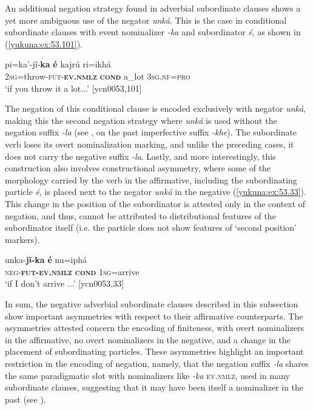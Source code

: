 \documentclass[output=paper,colorlinks,citecolor=brown]{langscibook}
\begin{document}
An additional negation strategy found in adverbial subordinate clauses shows a yet more ambiguous use of the negator \textit{unká}. This is the case in conditional subordinate clauses with event nominalizer \textit{-ka} and subordinator \textit{é}, as shown in (\ref{yukuna:ex:53.101}). 

\ea\label{yukuna:ex:53.101}
\gll pi=ka'-jĩ-\textbf{ka} \textbf{é}	kajrú 	ri=ikhá \\
\textsc{2sg}=throw-\textsc{fut}-\textbf{\textsc{ev.nmlz}} \textbf{\textsc{cond}} a\_lot \textsc{3sg.nf}=\textsc{pro} \\
\glt ‘if you throw it a lot{...}’ [ycn0053,101]
\z

The negation of this conditional clause is encoded exclusively with negator \textit{unká}, making this the second negation strategy where \textit{unká} is used without the negation suffix \textit{-la} (see , on the past imperfective suffix \textit{-khe}). The subordinate verb loses its overt nominalization marking, and unlike the preceding cases, it does not carry the negative suffix \textit{-la}. Lastly, and more interestingly, this construction also involves constructional asymmetry, where some of the morphology carried by the verb in the affirmative,  including the subordinating particle \textit{é}, is placed next to the negator \textit{unká} in the negative (\ref{yukuna:ex:53.33}). This change in the position of the subordinator is attested only in the context of negation, and thus, cannot be attributed to distributional features of the subordinator itself (i.e. the particle does not show features of `second position’ markers).

\ea\label{yukuna:ex:53.33}
\gll unka-\textbf{jĩ-ka} \textbf{é} 	nu=iphá \\
\textsc{neg}-\textbf{\textsc{fut}-\textsc{ev.nmlz}}  \textbf{\textsc{cond}} \textsc{1sg}=arrive \\
\glt ‘if I don't arrive {...}’ [ycn0053,33]
\z

In sum, the negative adverbial subordinate clauses described in this subsection show important asymmetries with respect to their affirmative counterparts. The asymmetries attested concern the encoding of finiteness, with overt nominalizers in the affirmative, no overt nominalizers in the negative, and a change in the placement of subordinating particles. These asymmetries highlight an important restriction in the encoding of negation, namely, that the negation suffix \textit{-la} shares the same paradigmatic slot with nominalizers like \textit{-ka} \textsc{ev.nmlz}, used in many subordinate clauses,  suggesting that it may have been itself a nominalizer in the past (see ).  
\end{document}
